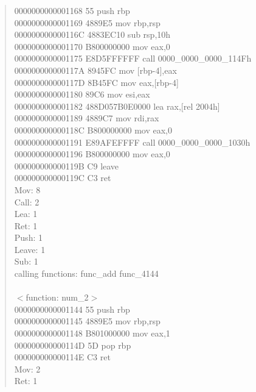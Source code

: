\documentclass[12pt,a4paper,dvipdfmx]{jsarticle}
\begin{document}
\begin{quote}
0000000000001168 55                   push      rbp \\
0000000000001169 4889E5               mov       rbp,rsp \\
000000000000116C 4883EC10             sub       rsp,10h \\
0000000000001170 B800000000           mov       eax,0 \\
0000000000001175 E8D5FFFFFF           call      0000\_0000\_0000\_114Fh \\
000000000000117A 8945FC               mov       [rbp-4],eax \\
000000000000117D 8B45FC               mov       eax,[rbp-4] \\
0000000000001180 89C6                 mov       esi,eax \\
0000000000001182 488D057B0E0000       lea       rax,[rel 2004h] \\
0000000000001189 4889C7               mov       rdi,rax \\
000000000000118C B800000000           mov       eax,0 \\
0000000000001191 E89AFEFFFF           call      0000\_0000\_0000\_1030h \\
0000000000001196 B800000000           mov       eax,0 \\
000000000000119B C9                   leave \\
000000000000119C C3                   ret \\
Mov: 8 \\
Call: 2 \\
Lea: 1 \\
Ret: 1 \\
Push: 1 \\
Leave: 1 \\
Sub: 1 \\
calling functions: func\_add func\_4144 \\
 \\
$<$function: num\_2$>$ \\
0000000000001144 55                   push      rbp \\
0000000000001145 4889E5               mov       rbp,rsp \\
0000000000001148 B801000000           mov       eax,1 \\
000000000000114D 5D                   pop       rbp \\
000000000000114E C3                   ret \\
Mov: 2 \\
Ret: 1 \\

\end{quote}
\end{document}
